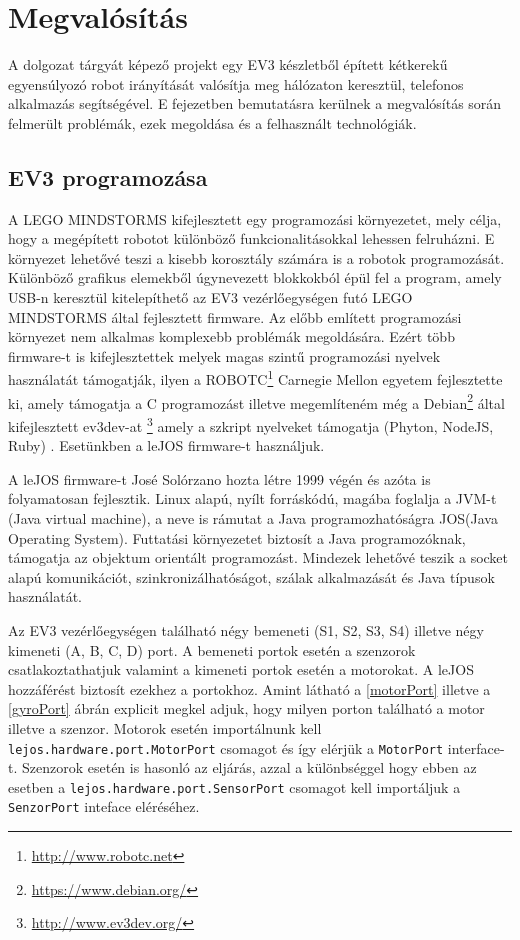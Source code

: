 \chapter{Megvalósítás}\label{ch:MEGVALOSITAS}
\begin{osszefoglal}
	A dolgozat tárgyát képező projekt egy EV3 készletből épített kétkerekű egyensúlyozó robot irányítását valósítja meg hálózaton keresztül, telefonos alkalmazás segítségével. E fejezetben bemutatásra kerülnek a megvalósítás során felmerült problémák, ezek megoldása és a felhasznált technológiák.
\end{osszefoglal}

\section{EV3 programozása}\label{sec:MEGVALOSITAS:lejos}
A LEGO MINDSTORMS kifejlesztett egy programozási környezetet, mely célja, hogy a megépített robotot különböző funkcionalitásokkal lehessen felruházni. E környezet lehetővé teszi a kisebb korosztály számára is a robotok programozását. Különböző grafikus elemekből úgynevezett blokkokból épül fel a program, amely USB-n keresztül kitelepíthető az EV3 vezérlőegységen futó LEGO MINDSTORMS által fejlesztett firmware.
Az előbb említett programozási környezet nem alkalmas komplexebb problémák megoldására. Ezért több firmware-t is kifejlesztettek melyek magas szintű programozási nyelvek használatát támogatják, ilyen a ROBOTC\footnote{\href {http://www.robotc.net}{http://www.robotc.net}} Carnegie Mellon egyetem fejlesztette ki, amely támogatja a C programozást illetve megemlíteném még a Debian\footnote{\href{https://www.debian.org/}{https://www.debian.org/}} által kifejlesztett ev3dev-at \footnote{\href{http://www.ev3dev.org/}{http://www.ev3dev.org/}} amely a szkript nyelveket támogatja (Phyton, NodeJS, Ruby) . Esetünkben a leJOS firmware-t használjuk.

A leJOS firmware-t José Solórzano hozta létre 1999 végén és azóta is folyamatosan fejlesztik. Linux alapú, nyílt forráskódú, magába foglalja a JVM-t (Java virtual machine), a neve is rámutat a Java programozhatóságra JOS(Java Operating System). Futtatási környezetet biztosít a Java programozóknak, támogatja az objektum orientált programozást. Mindezek lehetővé teszik a socket alapú komunikációt, szinkronizálhatóságot, szálak alkalmazását és Java típusok használatát.

Az EV3 vezérlőegységen található négy bemeneti (S1, S2, S3, S4) illetve négy kimeneti (A, B, C, D) port. A bemeneti portok esetén a szenzorok csatlakoztathatjuk valamint a kimeneti portok esetén a motorokat. A leJOS hozzáférést biztosít ezekhez a portokhoz. Amint látható a \ref{motorPort} illetve a \ref{gyroPort} ábrán explicit megkel adjuk, hogy milyen porton található a motor illetve a szenzor. Motorok esetén importálnunk kell \texttt{lejos.hardware.port.MotorPort} csomagot és így elérjük a \texttt{MotorPort} interface-t. Szenzorok esetén is hasonló az eljárás, azzal a különbséggel hogy ebben az esetben a \texttt{lejos.hardware.port.SensorPort} csomagot kell importáljuk a \texttt{SenzorPort} inteface eléréséhez.

